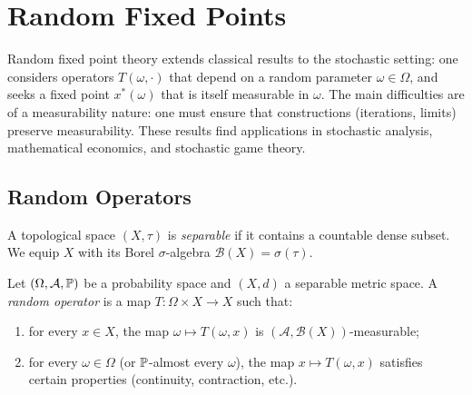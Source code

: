 \chapter{Random Fixed Points}
\label{ch:random}

\begin{intuition}
Random fixed point theory extends classical results to the stochastic setting: one
considers operators $T(\omega, \cdot)$ that depend on a random parameter
$\omega \in \Omega$, and seeks a fixed point $x^*(\omega)$ that is itself measurable in
$\omega$. The main difficulties are of a measurability nature: one must ensure that
constructions (iterations, limits) preserve measurability. These results find applications
in stochastic analysis, mathematical economics, and stochastic game theory.
\end{intuition}

\section{Random Operators}

\begin{definition}
A topological space $(X, \tau)$ is \emph{separable} if it contains a countable dense
subset. We equip $X$ with its Borel $\sigma$-algebra
$\mathcal{B}(X) = \sigma(\tau)$.
\end{definition}

\begin{definition}
Let $(\Omega, \mathcal{A}, \mathbb{P})$ be a probability space and $(X, d)$ a separable metric
space. A \emph{random operator} is a map $T\colon \Omega \times X \to X$ such that:
\begin{enumerate}
  \item for every $x \in X$, the map $\omega \mapsto T(\omega, x)$ is
    $(\mathcal{A}, \mathcal{B}(X))$-measurable;
  \item for every $\omega \in \Omega$ (or $\mathbb{P}$-almost every $\omega$), the map
    $x \mapsto T(\omega, x)$ satisfies certain properties (continuity, contraction, etc.).
\end{enumerate}
\end{definition}

